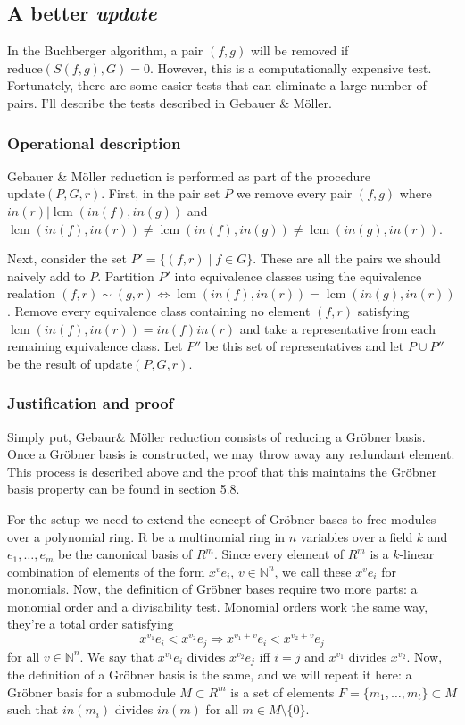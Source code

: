 \documentclass{article}
\theoremstyle{changedot}
\theoremstyle{changedotbreak}
\theoremstyle{nonumberplain}
\newcommand{\m}{\mathbb}
\DeclareMathOperator{\lcm}{lcm}
\begin{document}
\subsection{A better \emph{update}}  \label{sec:update}
In the Buchberger algorithm, a pair $(f, g)$ will be removed if $\text{reduce}(S(f, g), G) = 0$. However, this is a computationally expensive test. Fortunately, there are some easier tests that can eliminate a large number of pairs. I'll describe the tests described in Gebauer \& Möller.

\subsubsection{Operational description}
Gebauer \& Möller reduction is performed as part of the procedure $\text{update}(P, G, r)$. First, in the pair set $P$ we remove every pair $(f, g)$ where $in(r) | \lcm(in(f), in(g))$ and $\lcm(in(f), in(r)) \neq \lcm(in(f), in(g)) \neq \lcm(in(g), in(r))$.

Next, consider the set $P' = \{(f, r) \mid f \in G\}$. These are all the pairs we should naively add to $P$. Partition $P'$ into equivalence classes using the equivalence realation $(f, r) \sim (g, r) \Longleftrightarrow \lcm(in(f), in(r)) = \lcm(in(g), in(r))$. Remove every equivalence class containing no element $(f, r)$ satisfying $\lcm(in(f), in(r)) = in(f) in(r)$ and take a representative from each remaining equivalence class. Let $P''$ be this set of representatives and let $P \cup P''$ be the result of $\text{update}(P, G, r)$.


\subsubsection{Justification and proof}
Simply put, Gebaur\& Möller reduction consists of reducing a Gröbner basis. Once a Gröbner basis is constructed, we may throw away any redundant element. This process is described above and the proof that this maintains the Gröbner basis property can be found in \cite{NL} section 5.8.

For the setup we need to extend the concept of Gröbner bases to free modules over a polynomial ring. R be a multinomial ring in $n$ variables over a field $k$ and $e_{1}, \dots, e_{m}$ be the canonical basis of $R^{m}$. Since every element of $R^{m}$ is a $k$-linear combination of elements of the form $x^{v}e_{i}$, $v \in \m N^{n}$, we call these $x^{v}e_{i}$ for monomials. Now, the definition of Gröbner bases require two more parts: a monomial order and a divisability test. Monomial orders work the same way, they're a total order satisfying \[x^{v_{1}}e_i < x^{v_{2}}e_{j} \Longrightarrow x^{v_{1} + v} e_{i} < x^{v_{2} + v} e_{j}\] for all $v \in \m N^{n}$. We say that $x^{v_{1}}e_{i}$ divides $x^{v_{2}}e_{j}$ iff $i=j$ and $x^{v_{1}}$ divides $x^{v_{2}}$. Now, the definition of a Gröbner basis is the same, and we will repeat it here: a Gröbner basis for a submodule $M \subset R^{m}$ is a set of elements $F = \{m_{1}, \dots, m_{t}\} \subset M$ such that $in(m_{i})$ divides $in(m)$ for all $m \in M \setminus \{0\}$.
\end{document}
